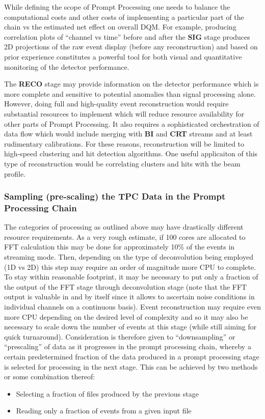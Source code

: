 \documentclass[pdftex,12pt,letter]{article}
\newcommand{\PP}{Prompt Processing\xspace}
\begin{document}
While defining the scope of \PP one needs to balance the computational costs and other costs of implementing
a particular part of the chain vs the estimated net effect on overall DQM. For example, producing correlation
plots of ``channel vs time'' before and after the \textbf{SIG} stage produces 2D projections of the raw event
display (before any reconstruction) and based on prior experience constitutes a powerful tool for both
visual and quantitative monitoring of the detector performance.

The \textbf{RECO} stage may provide information on the detector performance which is more complete
and sensitive to potential anomalies than signal processing alone. However, doing full and high-quality
event reconstruction would require substantial resources to implement which will reduce resource availability
for other parts of \PP. It also requires a sophisticated orchestration of data flow which would include
merging with \textbf{BI} and \textbf{CRT} streams and at least rudimentary calibrations. 
For these reasons, reconstruction will be limited to high-speed clustering and hit detection algorithms.
One useful applicaiton of this type of reconstruction would be correlating clusters and hits with
the beam profile.

\subsubsection{Sampling (pre-scaling) the TPC Data in the Prompt Processing Chain}
\label{sec:downsampling}
The categories of processing as outlined above may have drastically different resource requirements.
As a very rough estimate, if 100 cores are allocated to FFT calculation this may be done for approximately 10\% of the events
in streaming mode. Then, depending on the type of deconvolution being employed (1D vs 2D) this step
may require an order of magnitude more CPU to complete. To stay within reasonable footprint,
it may be necessary to put only a fraction of the output of the FFT stage through deconvolution stage
(note that the FFT output is valuable in and by itself since it allows to ascertain noise conditions in individual channels
on a continuous basis). Event reconstruction may require even more CPU depending on the desired level of complexity
and so it may also be necessary to scale down the number of events at this stage (while still aiming for quick turnaround).
Consideration is therefore given to ``downsampling'' or ``prescaling'' 
of data as it progresses in the prompt processing chain, whereby a certain predetermined fraction of the data
produced in a prompt processing stage is selected for processing in the next stage.
This can be achieved by two methods or some combination thereof:
\begin{itemize}
\item Selecting a fraction of files produced by the previous stage
\item Reading only a fraction of events from a given input file
\end{itemize}
\end{document}

